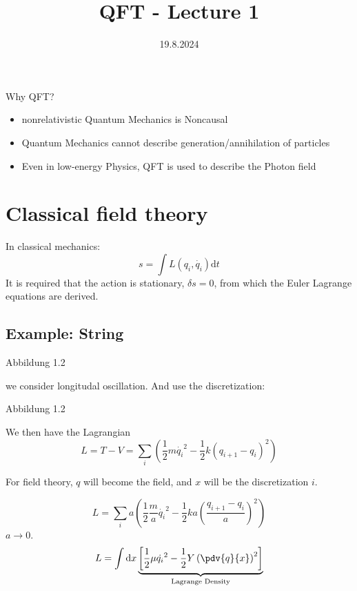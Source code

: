 \documentclass[]{scrartcl}
\title{QFT - Lecture 1}
\author{}
\date{19.8.2024}
\begin{document}
\maketitle
\newpage
\tableofcontents
\newpage

Why QFT?

\begin{itemize}
	\item nonrelativistic Quantum Mechanics is Noncausal

	\item Quantum Mechanics cannot describe generation/annihilation of particles

	\item Even in low-energy Physics, QFT is used to describe the Photon field
\end{itemize}

\section{Classical field theory}

In classical mechanics:
 \begin{equation}
 	s = \int L(q_i, \dot{q_i}) \text{d}t
 \end{equation}
It is required that the action is stationary, $\delta s = 0$, from which the Euler Lagrange equations are derived.

\subsection{Example: String}

Abbildung 1.2

we consider longitudal oscillation. And use the discretization:

Abbildung 1.2

We then have the Lagrangian
\begin{equation}
	L = T-V = \sum_i \left(\frac{1}{2}m\dot{q_i}^2 - \frac{1}{2} k(q_{i+1} - q_i)^2\right)
\end{equation}

For field theory, $q$ will become the field, and $x$ will be the discretization $i$.

\begin{equation}
	L = \sum_i a\left(\frac{1}{2}\frac{m}{a}\dot{q_i}^2 - \frac{1}{2}ka\left(\frac{q_{i+1} - q_i}{a}\right)^2\right)
\end{equation}
$a\rightarrow 0$.
\begin{equation}
	L = \int \text{d}x \underbrace{\left[\frac{1}{2}\mu \dot{q_i}^2 - \frac{1}{2}Y\left(\pdv{q}{x}\right)^2\right]}_{\text{Lagrange Density}}
\end{equation}
\end{document}
